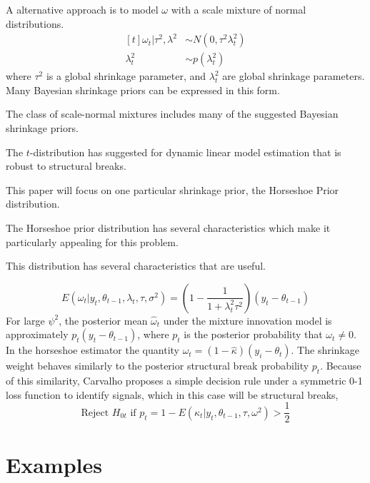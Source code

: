 \documentclass{article}
\begin{document}
A alternative approach is to model $\omega$ with a scale mixture of normal distributions.
\begin{equation}
  \label{eq:6}
  \begin{aligned}[t]
    \omega_{t} | \tau^{2}, \lambda^{2} & \sim N(0, \tau^{2} \lambda_{t}^{2}) \\
    \lambda_{t}^{2} & \sim p(\lambda^{2}_{t})
  \end{aligned}
\end{equation}
where $\tau^{2}$ is a global shrinkage parameter, and $\lambda_{t}^{2}$ are global shrinkage parameters.
Many Bayesian shrinkage priors can be expressed in this form. 

The class of scale-normal mixtures includes many of the suggested Bayesian shrinkage priors.

The $t$-distribution has suggested for dynamic linear model estimation that is robust to structural breaks.

This paper will focus on one particular shrinkage prior, the Horseshoe Prior distribution.

The Horseshoe prior distribution has several characteristics which make it particularly appealing for this problem.

This distribution has several characteristics that are useful.

\begin{equation}
  \label{eq:10}
  E(\omega_{t} | y_{t}, \theta_{t-1}, \lambda_{t}, \tau, \sigma^{2}) =
  \left(
    1 - \frac{1}{1 + \lambda_{t}^{2} \tau^{2}}
  \right) (y_{t} - \theta_{t - 1})
\end{equation}
For large $\psi^{2}$, the posterior mean $\hat\omega_{t}$ under the mixture innovation model is 
approximately $p_{t} (y_{t} - \theta_{t-1})$, where $p_{t}$ is the posterior probability that $\omega_{t} \neq 0$.
In the horseshoe estimator the quantity $\hat \omega_{t} = (1 - \hat \kappa) (y_{i} - \theta_{t})$.
The shrinkage weight behaves similarly to the posterior structural break probability $p_{t}$.
Because of this similarity, Carvalho proposes a simple decision rule under a symmetric 0-1 loss function
to identify signals, which in this case will be structural breaks,
\begin{equation}
  \label{eq:11}
  \text{Reject $H_{0t}$ if $p_{t} = 1 - E(\kappa_{t} | y_{t}, \theta_{t-1}, \tau, \omega^{2})$} > \frac{1}{2}
\end{equation}

\section{Examples}
\label{sec:examples}
\end{document}
